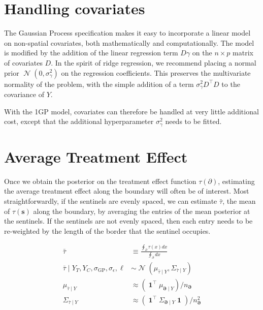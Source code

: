 \documentclass[letter]{article}
\newcommand{\genericdel}[3]{%
      \left#1#3\right#2
    }
\newcommand{\del}[1]{\genericdel(){#1}}
\DeclareMathOperator{\normal}{\mathcal{N}}
\DeclareMathOperator{\ones}{\mathbf{1}}
\newcommand{\trans}{^{\intercal}}
\newcommand{\sigmaf}{\sigma_{\mathrm{GP}}}
\newcommand{\sigman}{\sigma_{\epsilon}}
\newcommand{\sigmagamma}{\sigma_{\gamma}}
\newcommand{\svec}{\mathbold{s}}
\newcommand{\boundary}{\partial}
\newcommand{\sentinels}{\bm{\boundary}}
\newcommand{\linavg}{\bar{\tau}}
\begin{document}
    	\section{Handling covariates}\label{handling-covariates}

The Gaussian Process specification makes it easy to incorporate a linear
model on non-spatial covariates, both mathematically and
computationally. The model is modified by the addition of the linear
regression term \(D \gamma\) on the \(n \times p\) matrix of covariates
\(D\). In the spirit of ridge regression, we recommend placing a normal
prior \(\normal(0,\sigmagamma^2)\) on the regression coefficients. This
preserves the multivariate normality of the problem, with the simple
addition of a term \(\sigmagamma^2 D\trans D\) to the covariance of
\(Y\).

With the 1GP model, covariates can therefore be handled at very little
additional cost, except that the additional hyperparameter
\(\sigmagamma^2\) needs to be fitted.
    


    	\section{Average Treatment Effect}\label{average-treatment-effect}

Once we obtain the posterior on the treatment effect function
\(\tau(\boundary)\), estimating the average treatment effect along the
boundary will often be of interest. Most straightforwardly, if the
sentinels are evenly spaced, we can estimate \(\linavg\), the mean of
\(\tau(\svec)\) along the boundary, by averaging the entries of the mean
posterior at the sentinels. If the sentinels are not evenly spaced, then
each entry needs to be re-weighted by the length of the border that the
sentinel occupies.

\begin{equation}\begin{split}
    \linavg &\equiv \frac{\oint_\boundary \left. \tau(x) dx \right.}{\oint_\boundary \left. dx \right.} \\
    \linavg \mid Y_T, Y_C, \sigmaf, \sigman, \ell &\sim \normal\del{\mu_{\linavg \mid Y}, \Sigma_{\linavg \mid Y}} \\
    \mu_{\linavg \mid Y} &\approx \del{\ones\trans \mu_{\sentinels \mid Y}} / n_{\sentinels} \\
    \Sigma_{\linavg \mid Y} &\approx \del{\ones\trans \Sigma_{\sentinels \mid Y} \ones} / n_{\sentinels}^2
\end{split}\end{equation}
\end{document}
